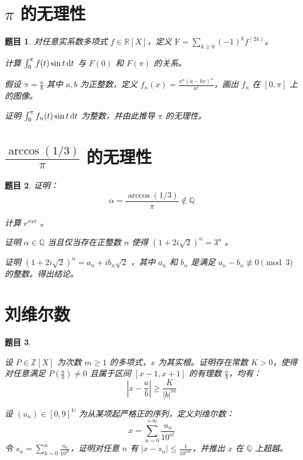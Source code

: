 \documentclass[12pt,UTF8]{ctexbook}
\theoremstyle{exercisestyle}
\newtheorem*{exercise}{题目}
\theoremstyle{solutionstyle}
\begin{document}
\section{$\pi$ 的无理性}
\begin{exercise}
  对任意实系数多项式 $f \in \mathbb{R}[X]$，定义 $\mathrm{F} = \sum\limits_{k \geqslant 0} (-1)^k f^{(2k)}$。
  \begin{subquestions}
    \item 计算 $\int_0^{\pi} f(t) \sin t \,\mathrm{d}t$ 与 $F(0)$ 和 $F(\pi)$ 的关系。
    \item 假设 $\pi = \frac{a}{b}$ 其中 $a, b$ 为正整数，定义 $f_n(x) = \frac{x^n (a - bx)^n}{n!}$，画出 $f_n$ 在 $[0, \pi]$ 上的图像。
    \item 证明 $\int_0^{\pi} f_n(t) \sin t \,\mathrm{d}t$ 为整数，并由此推导 $\pi$ 的无理性。
  \end{subquestions}
\end{exercise}

\section{$\frac{\arccos (1/3)}{\pi}$ 的无理性}
\begin{exercise}
证明：
$$
\alpha = \frac{\arccos (1/3)}{\pi} \notin \mathbb{Q}
$$
\begin{subquestions}
\item 计算 $e^{i\alpha\pi}$ 。
\item 证明 $\alpha \in \mathbb{Q}$ 当且仅当存在正整数 $n$ 使得 $(1 + 2i\sqrt{2})^n = 3^n$ 。
\item 证明 $(1+2i\sqrt{2})^n = a_n + ib_n\sqrt{2}$ ，其中 $a_n$ 和 $b_n$ 是满足 $a_n - b_n \not\equiv 0 \pmod{3}$ 的整数。得出结论。
\end{subquestions}
\end{exercise}

\section{刘维尔数}
\begin{exercise}
\begin{subquestions}
\item 设 $P \in \mathbb{Z}[X]$ 为次数 $m \geq 1$ 的多项式，$x$ 为其实根。证明存在常数 $K > 0$，使得对任意满足 $\displaystyle P(\frac{a}{b}) \neq 0$ 且属于区间 $[x-1,x+1]$ 的有理数 $\displaystyle\frac{a}{b}$，均有：
$$
\left|x-\frac{a}{b}\right| \geqslant \frac{K}{|b|^m}
$$
\item 设 $(u_n) \in [0, 9]^{\mathbb{N}}$ 为从某项起严格正的序列，定义刘维尔数：
$$
x = \sum_{n=0}^{+\infty} \frac{u_n}{10^{n!}}
$$
令 $\displaystyle s_n = \sum_{k=0}^n \frac{u_k}{10^{k!}}$，证明对任意 $n$ 有 $\displaystyle|x - s_n| \leq \frac{1}{10^{nn!}}$，并推出 $x$ 在 $\mathbb{Q}$ 上超越。
\end{subquestions}
\end{exercise}
\end{document}
